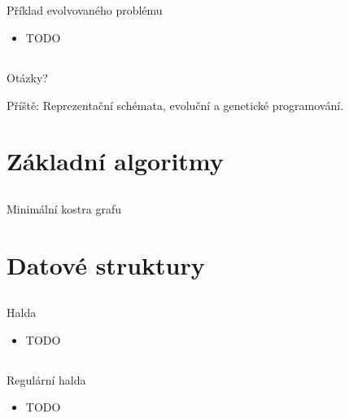\documentclass{beamer}
\begin{document}
\subsection{}
\begin{frame}{Příklad evolvovaného problému}
\begin{itemize}
\item TODO
\end{itemize}
\end{frame}

\subsection{}
\begin{frame}{Otázky?}
\begin{center}
Příště: Reprezentační schémata, evoluční a genetické programování.
\end{center}
\end{frame}

\section{Základní algoritmy}

\subsection{}
\begin{frame}{Minimální kostra grafu}
\end{frame}

\section{Datové struktury}

\subsection{}
\begin{frame}{Halda}
\begin{itemize}
\item TODO
\end{itemize}
\end{frame}

\subsection{}
\begin{frame}{Regulární halda}
\begin{itemize}
\item TODO
\end{itemize}
\end{frame}
\end{document}
